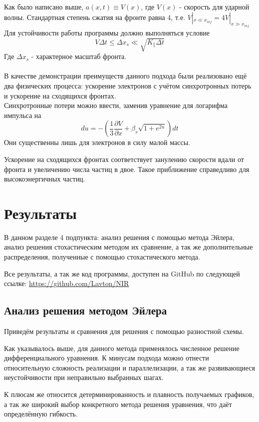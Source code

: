 \documentclass[a4paper,14pt]{extarticle} %
\begin{document}
Как было написано выше, $a(x,t) \equiv V(x)$, где $V(x)$ - скорость для ударной волны. Стандартная степень сжатия на фронте равна 4, т.е. $V|_{x \ll x_{inj}} = 4V|_{x \gg x_{inj}}$
Для устойчивости работы программы должно выполняться условие
\begin{equation}
V\Delta t \le \Delta x_s \ll \sqrt{K_\parallel \Delta t}
\end{equation}
Где $\Delta x_s$ - характерное масштаб фронта. ~\\~\\
В качестве демонстрации преимуществ данного подхода были реализовано ещё два физических процесса: ускорение электронов с учётом синхротронных потерь и ускорение на сходящихся фронтах.\\
Синхротронные потери можно ввести, заменив уравнение для логарифма импульса на 
\begin{equation}
du = - \left( \frac{1}{3} \frac{\partial V}{\partial x}  + \beta_s\sqrt{1+e^{2u}} \right) dt
\end{equation}
Они существенны лишь для электронов в силу малой массы.


Ускорение на сходящихся фронтах соответствует занулению скорости вдали от фронта и увеличению числа частиц в двое. Такое приближение справедливо для высокоэнергичных частиц.

\section{Результаты}
В данном разделе 4 подпункта: анализ решения с помощью метода Эйлера, анализ решения стохастическим методом их сравнение, а так же дополнительные распределения, полученные с помощью стохастического метода.

Все результаты, а так же код программы, доступен на GitHub по следующей ссылке: \url{https://github.com/Lavton/NIR}
\subsection{Анализ решения методом Эйлера}
Приведём результаты и сравнения для решения с помощью разностной схемы. 

Как указывалось выше, для данного метода применялось численное решение дифференциального уравнения. К минусам подхода можно отнести относительную сложность реализации и параллелизации, а так же развивающиеся неустойчивости при неправильно выбранных шагах.

К плюсам же относится детерминированность и плавность получаемых графиков, а так же широкий выбор конкретного метода решения уравнения, что даёт определённую гибкость.
\end{document}
